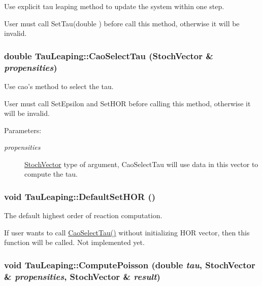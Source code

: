 Use explicit tau leaping method to update the system within one step. 

User must call SetTau(double ) before call this method, otherwise it will be invalid. \hypertarget{class_tau_leaping_8ca21d486f8bee4ac74b35814046742b}{
\subsubsection{\setlength{\rightskip}{0pt plus 5cm}double TauLeaping::CaoSelectTau ({\bf StochVector} \& {\em propensities})}}
\label{class_tau_leaping_8ca21d486f8bee4ac74b35814046742b}


Use cao's method to select the tau. 

User must call SetEpsilon and SetHOR before calling this method, otherwise it will be invalid. \begin{Desc}
\item[Parameters:]
\begin{description}
\item[{\em propensities}]\hyperlink{class_stoch_vector}{StochVector} type of argument, CaoSelectTau will use data in this vector to compute the tau. \end{description}
\end{Desc}
\hypertarget{class_tau_leaping_bf3fe61f601dba394a2e99c280d688a6}{
\subsubsection{\setlength{\rightskip}{0pt plus 5cm}void TauLeaping::DefaultSetHOR ()}}
\label{class_tau_leaping_bf3fe61f601dba394a2e99c280d688a6}


The default highest order of reaction computation. 

If user wants to call \hyperlink{class_tau_leaping_8ca21d486f8bee4ac74b35814046742b}{CaoSelectTau()} without initializing HOR vector, then this function will be called. Not implemented yet. \hypertarget{class_tau_leaping_df74b4a52d8758ae59635bd3b9463bff}{
\subsubsection{\setlength{\rightskip}{0pt plus 5cm}void TauLeaping::ComputePoisson (double {\em tau}, \/  {\bf StochVector} \& {\em propensities}, \/  {\bf StochVector} \& {\em result})}}
\label{class_tau_leaping_df74b4a52d8758ae59635bd3b9463bff}


